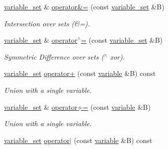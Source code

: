 \begin{DoxyCompactItemize}
\hyperlink{classmerlin_1_1variable__set}{variable\+\_\+set} \& \hyperlink{classmerlin_1_1variable__set_a02787f01d7e420e0b899df0d8470ffe6}{operator\&=} (const \hyperlink{classmerlin_1_1variable__set}{variable\+\_\+set} \&B)
\begin{DoxyCompactList}\small\item\em Intersection over sets (\&=). \end{DoxyCompactList}\item 
\hyperlink{classmerlin_1_1variable__set}{variable\+\_\+set} \& \hyperlink{classmerlin_1_1variable__set_a560733eccca448136404d23ea52724c5}{operator$^\wedge$=} (const \hyperlink{classmerlin_1_1variable__set}{variable\+\_\+set} \&B)
\begin{DoxyCompactList}\small\item\em Symmetric Difference over sets ($^\wedge$ xor). \end{DoxyCompactList}\item 
\hyperlink{classmerlin_1_1variable__set}{variable\+\_\+set} \hyperlink{classmerlin_1_1variable__set_af159ca7d11a0717f02db04f30b451e90}{operator+} (const \hyperlink{classmerlin_1_1variable}{variable} \&B) const \hypertarget{classmerlin_1_1variable__set_af159ca7d11a0717f02db04f30b451e90}{}\label{classmerlin_1_1variable__set_af159ca7d11a0717f02db04f30b451e90}

\begin{DoxyCompactList}\small\item\em Union with a single variable. \end{DoxyCompactList}\item 
\hyperlink{classmerlin_1_1variable__set}{variable\+\_\+set} \& \hyperlink{classmerlin_1_1variable__set_ae0b8d31cfe300460633c726565769f4e}{operator+=} (const \hyperlink{classmerlin_1_1variable}{variable} \&B)\hypertarget{classmerlin_1_1variable__set_ae0b8d31cfe300460633c726565769f4e}{}\label{classmerlin_1_1variable__set_ae0b8d31cfe300460633c726565769f4e}

\begin{DoxyCompactList}\small\item\em Union with a single variable. \end{DoxyCompactList}\item 
\hyperlink{classmerlin_1_1variable__set}{variable\+\_\+set} \hyperlink{classmerlin_1_1variable__set_a098b0421df3a5b1b230c6432376c350a}{operator$\vert$} (const \hyperlink{classmerlin_1_1variable}{variable} \&B) const \hypertarget{classmerlin_1_1variable__set_a098b0421df3a5b1b230c6432376c350a}{}\label{classmerlin_1_1variable__set_a098b0421df3a5b1b230c6432376c350a}


\end{DoxyCompactItemize}
